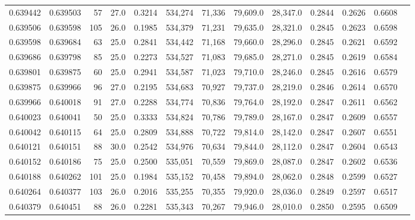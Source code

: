 \begin{tabular}{rrrrrrrrrrrrr}
0.639442 & 0.639503 &    57 & 27.0 &                                     0.3214 & 534,274 &  71,336 &  79,609.0 &  28,347.0 & 0.2844 & 0.2626 & 0.6608 \\
0.639506 & 0.639598 &   105 & 26.0 &                                     0.1985 & 534,379 &  71,231 &  79,635.0 &  28,321.0 & 0.2845 & 0.2623 & 0.6598 \\
0.639598 & 0.639684 &    63 & 25.0 &                                     0.2841 & 534,442 &  71,168 &  79,660.0 &  28,296.0 & 0.2845 & 0.2621 & 0.6592 \\
0.639686 & 0.639798 &    85 & 25.0 &                                     0.2273 & 534,527 &  71,083 &  79,685.0 &  28,271.0 & 0.2845 & 0.2619 & 0.6584 \\
0.639801 & 0.639875 &    60 & 25.0 &                                     0.2941 & 534,587 &  71,023 &  79,710.0 &  28,246.0 & 0.2845 & 0.2616 & 0.6579 \\
0.639875 & 0.639966 &    96 & 27.0 &                                     0.2195 & 534,683 &  70,927 &  79,737.0 &  28,219.0 & 0.2846 & 0.2614 & 0.6570 \\
0.639966 & 0.640018 &    91 & 27.0 &                                     0.2288 & 534,774 &  70,836 &  79,764.0 &  28,192.0 & 0.2847 & 0.2611 & 0.6562 \\
0.640023 & 0.640041 &    50 & 25.0 &                                     0.3333 & 534,824 &  70,786 &  79,789.0 &  28,167.0 & 0.2847 & 0.2609 & 0.6557 \\
0.640042 & 0.640115 &    64 & 25.0 &                                     0.2809 & 534,888 &  70,722 &  79,814.0 &  28,142.0 & 0.2847 & 0.2607 & 0.6551 \\
0.640121 & 0.640151 &    88 & 30.0 &                                     0.2542 & 534,976 &  70,634 &  79,844.0 &  28,112.0 & 0.2847 & 0.2604 & 0.6543 \\
0.640152 & 0.640186 &    75 & 25.0 &                                     0.2500 & 535,051 &  70,559 &  79,869.0 &  28,087.0 & 0.2847 & 0.2602 & 0.6536 \\
0.640188 & 0.640262 &   101 & 25.0 &                                     0.1984 & 535,152 &  70,458 &  79,894.0 &  28,062.0 & 0.2848 & 0.2599 & 0.6527 \\
0.640264 & 0.640377 &   103 & 26.0 &                                     0.2016 & 535,255 &  70,355 &  79,920.0 &  28,036.0 & 0.2849 & 0.2597 & 0.6517 \\
0.640379 & 0.640451 &    88 & 26.0 &                                     0.2281 & 535,343 &  70,267 &  79,946.0 &  28,010.0 & 0.2850 & 0.2595 & 0.6509 \\

\end{tabular}
